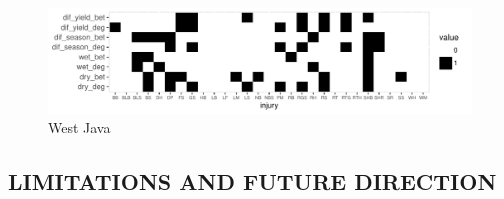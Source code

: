 \begin{landscape}    
\begin{figure}
\centering
\includegraphics[height = 0.4\textwidth]{figures/sum_mat_WJ.pdf}
\caption{West Java}
\end{figure}    
\end{landscape} 

\newpage
\subsection{LIMITATIONS AND FUTURE DIRECTION}

